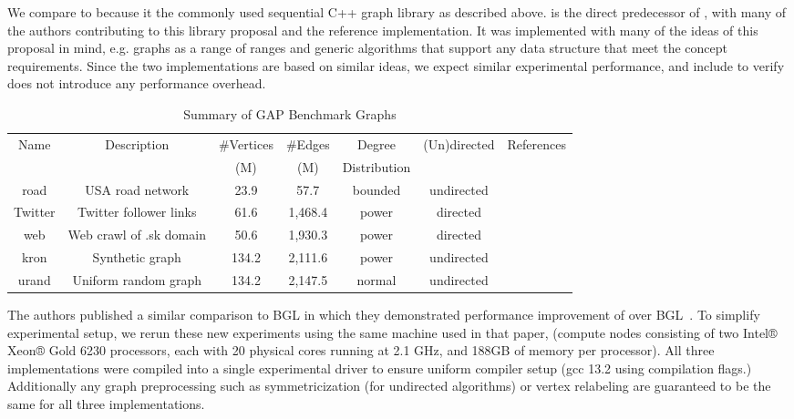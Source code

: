 We compare to \bgl because it the commonly used sequential C++ graph library as described above.
\nwgraph is the direct predecessor of \stdgraph, with many of the \nwgraph authors contributing to this library proposal and the \stdgraph reference implementation.
It was implemented with many of the ideas of this proposal in mind, e.g. graphs as a range of ranges and generic algorithms that support any data structure that meet the concept requirements.
Since the two implementations are based on similar ideas, we expect similar experimental performance, and include \nwgraph to verify \stdgraph does not introduce any performance overhead.

\begin{table}[h!]
\centering
\begin{tabular}{c c c c c c c}
Name & Description & \#Vertices & \#Edges & Degree & (Un)directed & References \\
     &             & (M)        & (M)     & Distribution & & \\\hline
road & USA road network & 23.9 & 57.7 & bounded & undirected & \cite{dimacs9th}\\\hline
Twitter & Twitter follower links & 61.6 & 1,468.4 & power & directed & \cite{Twitter}\\\hline
web & Web crawl of .sk domain & 50.6 & 1,930.3 & power & directed & \cite{LAW1}\\\hline
kron & Synthetic graph & 134.2 & 2,111.6 & power & undirected & \cite{Graph500} \\\hline
urand & Uniform random graph & 134.2 & 2,147.5 & normal & undirected & \cite{Erdos}\\\hline
\end{tabular}
\caption{Summary of GAP Benchmark Graphs}
\label{tab:gap_graphs}
\end{table}

The \nwgraph authors published a similar comparison to BGL in which they
demonstrated performance improvement of \nwgraph over BGL~\cite{REF_nwgraph_paper}.
To simplify experimental setup, we rerun these new experiments using the same machine used in that paper,
(compute nodes consisting of two Intel® Xeon® Gold 6230 processors, each with 20 physical cores running at 2.1 GHz,
and 188GB of memory per processor).
All three implementations were compiled into a single experimental driver to ensure uniform compiler setup (gcc 13.2 using  compilation flags.)
Additionally any graph preprocessing such as symmetricization (for undirected algorithms) or vertex relabeling are guaranteed to be the same for all three implementations.

